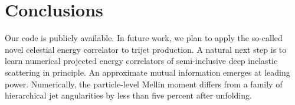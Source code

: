\section{Conclusions}\label{sec:conclusions}

Our code is publicly available. In future work, we plan to apply the
so-called novel celestial energy correlator to trijet production. A
natural next step is to learn numerical projected energy correlators of
semi-inclusive deep inelastic scattering in principle. An approximate
mutual information emerges at leading power. Numerically, the
particle-level Mellin moment differs from a family of hierarchical jet
angularities by less than five percent after unfolding.

